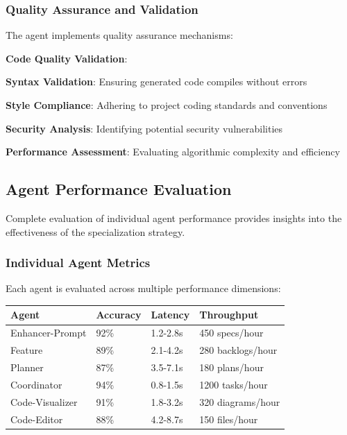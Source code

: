 \subsubsection*{Quality Assurance and Validation}

The agent implements quality assurance mechanisms:

\begin{alertbox}
\textbf{Code Quality Validation}:
\begin{compactlist}
    \item \textbf{Syntax Validation}: Ensuring generated code compiles without errors
    \item \textbf{Style Compliance}: Adhering to project coding standards and conventions
    \item \textbf{Security Analysis}: Identifying potential security vulnerabilities
    \item \textbf{Performance Assessment}: Evaluating algorithmic complexity and efficiency
\end{compactlist}
\end{alertbox}

\subsection*{Agent Performance Evaluation}

Complete evaluation of individual agent performance provides insights into the effectiveness of the specialization strategy.

\subsubsection*{Individual Agent Metrics}

Each agent is evaluated across multiple performance dimensions:

\begin{center}
\begin{tabular}{@{}llll@{}}
\toprule
\textbf{Agent} & \textbf{Accuracy} & \textbf{Latency} & \textbf{Throughput} \\
\midrule
Enhancer-Prompt & 92\% & 1.2-2.8s & 450 specs/hour \\
Feature & 89\% & 2.1-4.2s & 280 backlogs/hour \\
Planner & 87\% & 3.5-7.1s & 180 plans/hour \\
Coordinator & 94\% & 0.8-1.5s & 1200 tasks/hour \\
Code-Visualizer & 91\% & 1.8-3.2s & 320 diagrams/hour \\
Code-Editor & 88\% & 4.2-8.7s & 150 files/hour \\
\bottomrule
\end{tabular}
\end{center}

